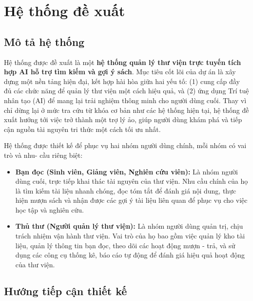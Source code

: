 \chapter{Hệ thống đề xuất}
\label{chap:HeThongDeXuat}

\section{Mô tả hệ thống}
\label{sec:MoTaHeThong}

Hệ thống được đề xuất là một \textbf{hệ thống quản lý thư viện trực tuyến tích hợp AI hỗ trợ tìm kiếm và gợi ý sách}. Mục tiêu cốt lõi của dự án là xây dựng một nền tảng hiện đại, kết hợp hài hòa giữa hai yếu tố: (1) cung cấp đầy đủ các chức năng để quản lý thư viện một cách hiệu quả, và (2) ứng dụng Trí tuệ nhân tạo (AI) để mang lại trải nghiệm thông minh cho người dùng cuối. Thay vì chỉ dừng lại ở mức tra cứu từ khóa cơ bản như các hệ thống hiện tại, hệ thống đề xuất hướng tới việc trở thành một trợ lý ảo, giúp người dùng khám phá và tiếp cận nguồn tài nguyên tri thức một cách tối ưu nhất.

Hệ thống được thiết kế để phục vụ hai nhóm người dùng chính, mỗi nhóm có vai trò và nhu- cầu riêng biệt:
\begin{itemize}
    \item \textbf{Bạn đọc (Sinh viên, Giảng viên, Nghiên cứu viên):} Là nhóm người dùng cuối, trực tiếp khai thác tài nguyên của thư viện. Nhu cầu chính của họ là tìm kiếm tài liệu nhanh chóng, đọc tóm tắt để đánh giá nội dung, thực hiện mượn sách và nhận được các gợi ý tài liệu liên quan để phục vụ cho việc học tập và nghiên cứu.
    
    \item \textbf{Thủ thư (Người quản lý thư viện):} Là nhóm người dùng quản trị, chịu trách nhiệm vận hành thư viện. Vai trò của họ bao gồm việc quản lý kho tài liệu, quản lý thông tin bạn đọc, theo dõi các hoạt động mượn - trả, và sử dụng các công cụ thống kê, báo cáo tự động để đánh giá hiệu quả hoạt động của thư viện.
\end{itemize}

\section{Hướng tiếp cận thiết kế}
\label{subsec:DesignApproach}

